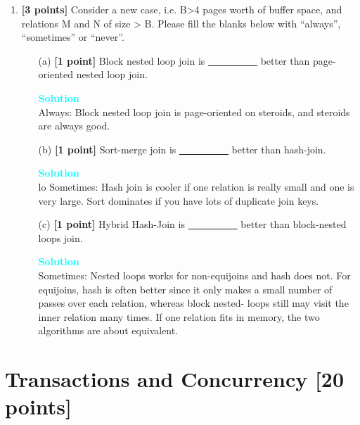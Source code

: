 \documentclass[10pt]{article}
\newenvironment{solution}
    { \begin{mdframed}[backgroundcolor=gray!10] \textcolor{cyan}{\textbf{Solution}} \\}
    {  \end{mdframed}}
\begin{document}
\begin{enumerate}
	\item \textbf{[3 points]}
	      Consider a new case, i.e. B>4 pages worth of buffer space, and relations M and N of size > B.
	      Please fill the blanks below with ``always'', ``sometimes'' or ``never''.
	      \begin{itemize}
		      \item[(a)] \textbf{[1 point]} Block nested loop join is \underline{\ \ \ \ \ \ \ \ \ \ } better than page-oriented nested loop join.
		            \begin{solution}
			            Always: Block nested loop join is page-oriented on steroids, and steroids are always good.
		            \end{solution}
		      \item[(b)] \textbf{[1 point]} Sort-merge join is \underline{\ \ \ \ \ \ \ \ \ \ } better than hash-join.
		            \begin{solution}
lo			            Sometimes: Hash join is cooler if one relation is really small and one is very large. Sort dominates if you have lots of duplicate join keys.
		            \end{solution}
		      \item[(c)] \textbf{[1 point]} Hybrid Hash-Join is \underline{\ \ \ \ \ \ \ \ \ \ } better than block-nested loops join.
		            \begin{solution}
			            Sometimes: Nested loops works for non-equijoins and hash does not.
			            For equijoins, hash is often better since it only makes a small number of passes over each relation, whereas block nested- loops still may visit the inner relation many times. If one relation fits in memory, the two algorithms are about equivalent.
		            \end{solution}
	      \end{itemize}
\end{enumerate}



\newpage
\section{Transactions and Concurrency \textbf{[20 points]}}
\end{document}
